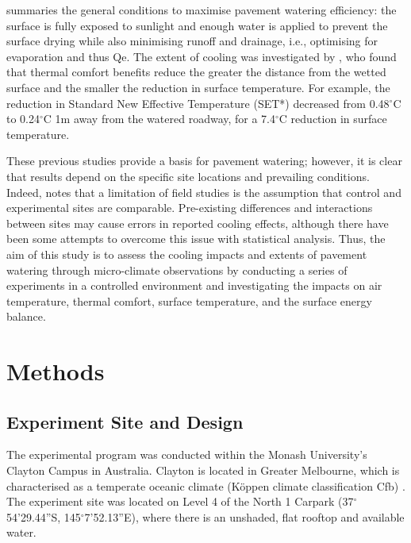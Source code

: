\documentclass[final,3p,times,authoryear]{elsarticle}
\begin{document}
\cite{Hendel2020} summaries the general conditions to maximise pavement watering efficiency: the surface is fully exposed to sunlight and enough water is applied to prevent the surface drying while also minimising runoff and drainage, i.e., optimising for evaporation and thus \gls{Qe}. The extent of cooling was investigated by \cite{Takebayashi2021}, who found that thermal comfort benefits reduce the greater the distance from the wetted surface and the smaller the reduction in surface temperature. For example, the reduction in Standard New Effective Temperature (SET*) decreased from 0.48$^{\circ}$C to 0.24$^{\circ}$C 1m away from the watered roadway, for a 7.4$^{\circ}$C reduction in surface temperature. 

These previous studies provide a basis for pavement watering; however, it is clear that results depend on the specific site locations and prevailing conditions. Indeed, \cite{Hendel2016} notes that a limitation of field studies is the assumption that control and experimental sites are comparable. Pre-existing differences and interactions between sites may cause errors in reported cooling effects, although there have been some attempts to overcome this issue with statistical analysis. Thus, the aim of this study is to assess the cooling impacts and extents of pavement watering through micro-climate observations by conducting a series of experiments in a controlled environment and investigating the impacts on air temperature, thermal comfort, surface temperature, and the surface energy balance. 




\section{Methods}\label{sec:methods2}
\subsection{Experiment Site and Design}\label{sec:methods2.1}

The experimental program was conducted within the Monash University's Clayton Campus in Australia. Clayton is located in Greater Melbourne, which is characterised as a temperate oceanic climate (K\"{o}ppen climate classification Cfb) \citep{Beck2018}. The experiment site was located on Level 4 of the North 1 Carpark (37$^{\circ}$54'29.44''S, 145$^{\circ}$7'52.13''E), where there is an unshaded, flat rooftop and available water.
\end{document}

